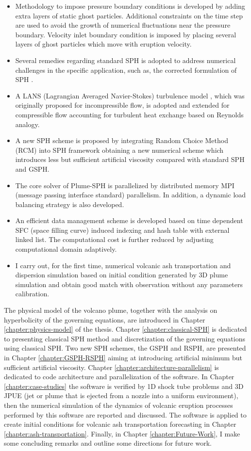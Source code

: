 \begin{itemize}
\item Methodology to impose pressure boundary conditions is developed by adding extra layers of static ghost particles. Additional constraints on the time step are used to avoid the growth of numerical fluctuations near the pressure boundary. Velocity inlet boundary condition is imposed by placing several layers of ghost particles which move with eruption velocity.
\item Several remedies regarding standard SPH is adopted to address numerical challenges in the specific application, such as, the corrected formulation of SPH \citep{chen1999improvement}.
\item  A LANS (Lagrangian Averaged Navier-Stokes) turbulence model \citep{monaghan2011turbulence}, which was originally proposed for incompressible flow, is adopted and extended for compressible flow accounting for turbulent heat exchange based on Reynolds analogy.
\item A new SPH scheme is proposed by integrating Random Choice Method (RCM) into SPH framework obtaining a new numerical scheme which introduces less but sufficient artificial viscosity compared with standard SPH and GSPH.
\item The core solver of Plume-SPH is parallelized by distributed memory MPI (message passing interface standard) parallelism. In addition, a dynamic load balancing strategy is also developed. 
\item An efficient data management scheme is developed based on time dependent SFC (space filling curve) induced indexing and hash table with external linked list. The computational cost is further reduced by adjusting computational domain adaptively.
\item I carry out, for the first time, numerical volcanic ash transportation and dispersion simulation based on initial condition generated by 3D plume simulation and obtain good match with observation without any parameters calibration.
\end{itemize}

The physical model of the volcano plume, together with the analysis on hyperbolicity of the governing equations, are introduced in Chapter \ref{chapter:physics-model} of the thesis. Chapter \ref{chapter:classical-SPH} is dedicated to presenting
classical SPH method and discretization of the governing equations using classical SPH. Two new SPH schemes, the GSPH and RSPH, are presented in Chapter \ref{chapter:GSPH-RSPH} aiming at introducing artificial minimum but sufficient artificial viscosity. Chapter \ref{chapter:architecture-parallelism} is dedicated to code architecture and parallelization of the software. In Chapter \ref{chapter:case-studies} the software is verified by 1D shock tube problems and 3D JPUE (jet or plume that is ejected from a nozzle into a uniform environment), then the numerical simulation of the dynamics of volcanic eruption processes
performed by this software are reported and discussed. The software is applied to create initial conditions for volcanic ash transportation forecasting in Chapter \ref{chapter:ash-transportation}. Finally, in Chapter \ref{chapter:Future-Work}, I
make some concluding remarks and outline some directions for future work.